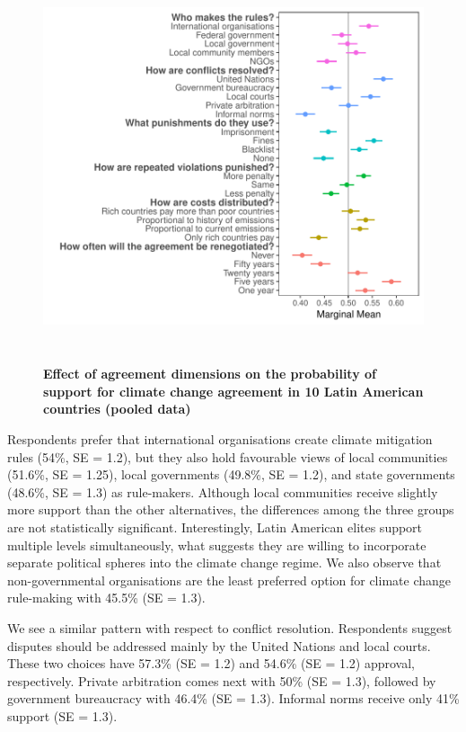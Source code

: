 \documentclass[a4paper,12pt]{article}
\begin{document}
\begin{figure}[H]
	\centering
	\includegraphics[width=.9\linewidth,height=11.5cm]{pooled.pdf}
	\caption{\textbf{Effect of agreement dimensions on the probability of support for climate change agreement in 10 Latin American countries (pooled data)}}
	\label{fig:pooled}
\end{figure}

Respondents prefer that international organisations create climate mitigation rules (54\%, SE = 1.2), but they also hold favourable views of local communities (51.6\%, SE = 1.25), local governments (49.8\%, SE = 1.2), and state governments (48.6\%, SE = 1.3) as rule-makers. Although local communities receive slightly more support than the other alternatives, the differences among the three groups are not statistically significant. Interestingly, Latin American elites support multiple levels simultaneously, what suggests they are willing to incorporate separate political spheres into the climate change regime. We also observe that non-governmental organisations are the least preferred option for climate change rule-making with 45.5\% (SE = 1.3). 

We see a similar pattern with respect to conflict resolution. Respondents suggest disputes should be addressed mainly by the United Nations and local courts. These two choices have 57.3\% (SE = 1.2) and 54.6\% (SE = 1.2) approval, respectively. Private arbitration comes next with 50\% (SE = 1.3), followed by government bureaucracy with 46.4\% (SE = 1.3). Informal norms receive only 41\% support (SE = 1.3). 
\end{document}
